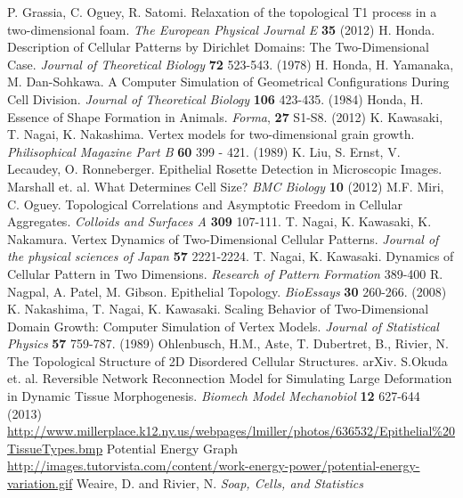 \begin{thebibliography}{1}
 P. Grassia, C. Oguey, R. Satomi. Relaxation of the topological T1 process in a two-dimensional foam. \emph{The European Physical Journal E} \textbf{35} (2012)
 H. Honda. Description of Cellular Patterns by Dirichlet Domains: The Two-Dimensional Case. \emph{Journal of Theoretical Biology} \textbf{72} 523-543. (1978)
 H. Honda, H. Yamanaka, M. Dan-Sohkawa. A Computer Simulation of Geometrical Configurations During Cell Division. \emph{Journal of Theoretical Biology} \textbf{106} 423-435. (1984)
 Honda, H. Essence of Shape Formation in Animals. \emph{Forma}, \textbf{27} S1-S8. (2012)
 K. Kawasaki, T. Nagai, K. Nakashima. Vertex models for two-dimensional grain growth. \emph{Philisophical Magazine Part B} \textbf{60} 399 - 421. (1989)
 K. Liu, S. Ernst, V. Lecaudey, O. Ronneberger. Epithelial Rosette Detection in Microscopic Images.
 Marshall et. al. What Determines Cell Size? \emph{BMC Biology} \textbf{10} (2012)
 M.F. Miri, C. Oguey. Topological Correlations and Asymptotic Freedom in Cellular Aggregates. \emph{Colloids and Surfaces A} \textbf{309} 107-111.
 T. Nagai, K. Kawasaki, K. Nakamura. Vertex Dynamics of Two-Dimensional Cellular Patterns. \emph{Journal of the physical sciences of Japan} \textbf{57} 2221-2224.
 T. Nagai, K. Kawasaki. Dynamics of Cellular Pattern in Two Dimensions. \emph{Research of Pattern Formation} 389-400
 R. Nagpal, A. Patel, M. Gibson. Epithelial Topology. \emph{BioEssays} \textbf{30} 260-266. (2008)
 K. Nakashima, T. Nagai, K. Kawasaki. Scaling Behavior of Two-Dimensional  Domain Growth: Computer Simulation of Vertex Models. \emph{Journal of Statistical Physics} \textbf{57} 759-787. (1989)
 Ohlenbusch, H.M., Aste, T. Dubertret, B., Rivier, N. The Topological Structure of 2D Disordered Cellular Structures. arXiv.
 S.Okuda et. al. Reversible Network Reconnection Model for Simulating Large Deformation in Dynamic Tissue Morphogenesis. \emph{Biomech Model Mechanobiol} \textbf{12} 627-644 (2013)
 \url{http://www.millerplace.k12.ny.us/webpages/lmiller/photos/636532/Epithelial\%20TissueTypes.bmp}
 Potential Energy Graph \url{http://images.tutorvista.com/content/work-energy-power/potential-energy-variation.gif}
 Weaire, D. and Rivier, N. \emph{Soap, Cells, and Statistics}

\end{thebibliography}
